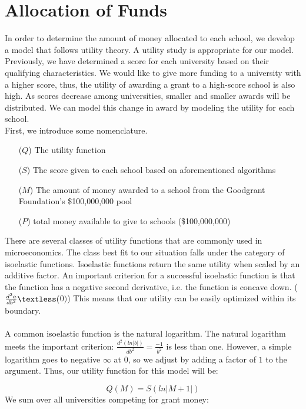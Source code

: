 \documentclass[paper.tex]{subfiles}
\begin{document}
	\section{Allocation of Funds}
	
	In order to determine the amount of money allocated to each school, we develop a model that follows utility theory. A utility study is appropriate for our model. Previously, we have determined a score for each university based on their qualifying characteristics. We would like to give more funding to a university with a higher score, thus, the utility of awarding a grant to a high-score school is also high. As scores decrease among universities, smaller and smaller awards will be distributed. We can model this change in award by modeling the utility for each school.
	\\
	
	First, we introduce some nomenclature.
	\begin{itemize}
		\item[($Q$)] The utility function
		\item[($S$)] The score given to each school based on aforementioned algorithms
		\item[($M$)] The amount of money awarded to a school from the Goodgrant Foundation's \$100,000,000 pool
		\item[($P$)] total money available to give to schools (\$100,000,000)
	\end{itemize}
	There are several classes of utility functions that are commonly used in microeconomics. The class best fit to our situation falls under the category of isoelastic functions. Isoelastic functions return the same utility when scaled by an additive factor. \cite{norstad1999introduction}
	An important criterion for a successful isoelastic function is that the function has a negative second derivative, i.e. the function is concave down. ($ \frac{d^2a}{db^2} \textless ($0$) $)
	This means that our utility can be easily optimized within its boundary. 
	\\\\
	A common isoelastic function is the natural logarithm. The natural logarithm meets the important criterion: $ \frac{d^2(ln|b|)}{db^2} = \frac{-1}{b^2} $ is less than one. However, a simple logarithm goes to negative $\infty$ at $0$, so we adjust by adding a factor of $1$ to the argument. Thus, our utility function for this model will be:
	
	$$ Q(M) = S(ln|M+1|) $$
	We sum over all universities competing for grant money:
	
\end{document}
